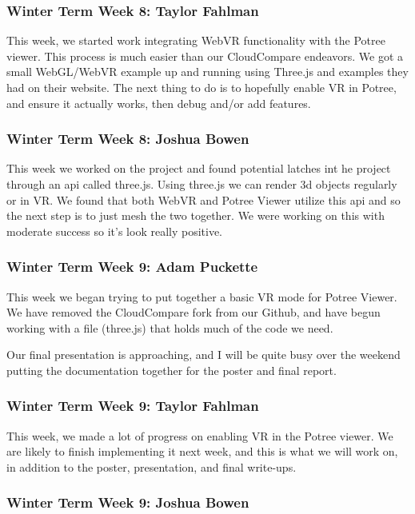 \documentclass[draftclsnofoot,onecolumn]{IEEEtran}
\begin{document}
\subsubsection{Winter Term Week 8: Taylor Fahlman}

This week, we started work integrating WebVR functionality with the Potree viewer. This process is much easier than our CloudCompare endeavors. We got a small WebGL/WebVR example up and running using Three.js and examples they had on their website. The next thing to do is to hopefully enable VR in Potree, and ensure it actually works, then debug and/or add features.

\subsubsection{Winter Term Week 8: Joshua Bowen}

This week we worked on the project and found potential latches int he project through an api called three.js. Using three.js we can render 3d objects regularly or in VR. We found that both WebVR and Potree Viewer utilize this api and so the next step is to just mesh the two together. We were working on this with moderate success so it's look really positive.

\subsubsection{Winter Term Week 9: Adam Puckette}

This week we began trying to put together a basic VR mode for Potree Viewer. We have removed the CloudCompare fork from our Github, and have begun working with a file (three.js) that holds much of the code we need.

Our final presentation is approaching, and I will be quite busy over the weekend putting the documentation together for the poster and final report.

\subsubsection{Winter Term Week 9: Taylor Fahlman}

This week, we made a lot of progress on enabling VR in the Potree viewer. We are likely to finish implementing it next week, and this is what we will work on, in addition to the poster, presentation, and final write-ups.

\subsubsection{Winter Term Week 9: Joshua Bowen}
\end{document}
